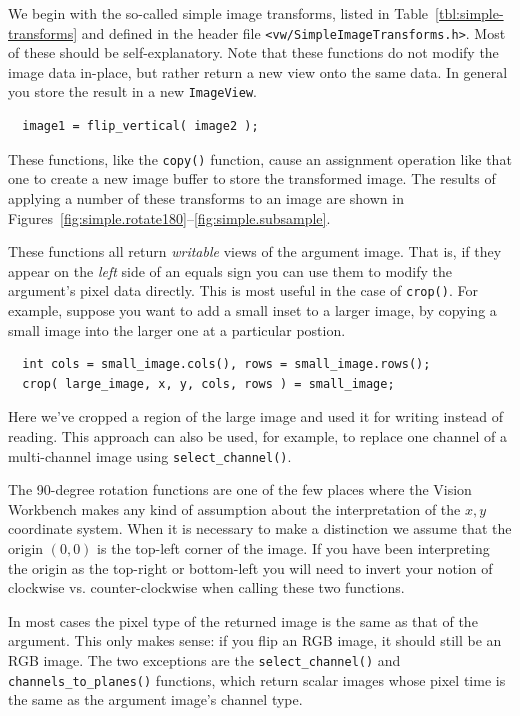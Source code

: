 We begin with the so-called simple image transforms, listed in
Table~\ref{tbl:simple-transforms} and defined in the header file
\verb#<vw/SimpleImageTransforms.h>#.  Most of these should be 
self-explanatory.  Note that these functions do not modify the 
image data in-place, but rather return a new view onto the same 
data.  In general you store the result in a new \verb#ImageView#.
\begin{verbatim}
  image1 = flip_vertical( image2 );
\end{verbatim}
These functions, like the \verb#copy()# function, cause an assignment
operation like that one to create a new image buffer to store the
transformed image.  The results of applying a number of these
transforms to an image are shown in
Figures~\ref{fig:simple.rotate180}--\ref{fig:simple.subsample}.

These functions all return {\it writable} views of the argument image.
That is, if they appear on the {\it left} side of an equals sign you
can use them to modify the argument's pixel data directly.  This is
most useful in the case of \verb#crop()#.  For example, suppose you
want to add a small inset to a larger image, by copying a small 
image into the larger one at a particular postion.
\begin{verbatim}
  int cols = small_image.cols(), rows = small_image.rows();
  crop( large_image, x, y, cols, rows ) = small_image;
\end{verbatim}
Here we've cropped a region of the large image and used it for writing
instead of reading.  This approach can also be used, for example, to
replace one channel of a multi-channel image using
\verb#select_channel()#.

The 90-degree rotation functions are one of the few places where the
Vision Workbench makes any kind of assumption about the interpretation
of the $x,y$ coordinate system.  When it is necessary to make a
distinction we assume that the origin $(0,0)$ is the top-left corner
of the image.  If you have been interpreting the origin as the
top-right or bottom-left you will need to invert your notion of
clockwise vs. counter-clockwise when calling these two functions.

In most cases the pixel type of the returned image is the same as that
of the argument.  This only makes sense: if you flip an RGB image, it
should still be an RGB image.  The two exceptions are the
\verb#select_channel()# and \verb#channels_to_planes()# functions,
which return scalar images whose pixel time is the same as the
argument image's channel type.

